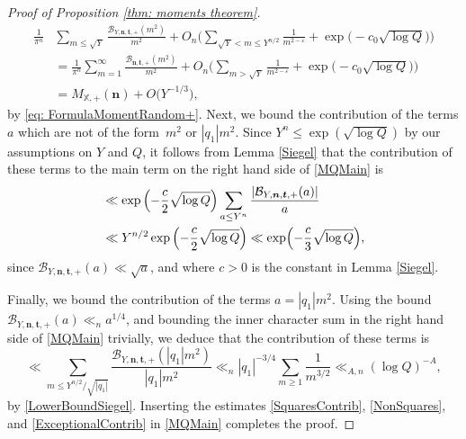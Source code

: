 \documentclass[10pt]{amsart}
\theoremstyle{plain}
\theoremstyle{definition}
\newcommand{\X}{\mathbb{X}}
\newcommand{\B}{\mathcal{B}}
\newcommand{\un}{\boldsymbol{n}}
\newcommand{\ut}{\boldsymbol{t}}
\begin{document}
\begin{proof}[Proof of Proposition \ref{thm: moments theorem}]
\begin{equation}
\begin{aligned}
\frac{1}{\pi^n}&\sum_{m\leq \sqrt{Y}}\frac{\B_{Y,\un, \ut, +}(m^2)}{m^2} + O_n\biggl(\sum_{\sqrt{Y}<m\leq Y^{n/2}}\frac{1}{m^{2-\varepsilon}}+ \exp\bigl(-c_0\sqrt{\log Q}\bigr)\biggr)\\
&= \frac{1}{\pi^n}\sum_{m=1}^{\infty}\frac{\B_{\un, \ut, +}(m^2)}{m^2} + O_n\biggl(\sum_{m> \sqrt{Y}}\frac{1}{m^{2-\varepsilon}}+\exp\bigl(-c_0\sqrt{\log Q}\bigr)\biggr)\\
&= M_{\X, +}(\un)+ O\bigl(Y^{-1/3}\bigr),
\end{aligned}
\end{equation}
by \eqref{eq: FormulaMomentRandom+}.
Next, we bound the contribution of the terms $a$ which are not of the form~$m^2$ or $|q_1|m^2$. Since $Y^n\leq \exp\left(\sqrt{\log Q}\right)$ by our assumptions on $Y$ and $Q$, it follows from Lemma \ref{Siegel} that the contribution of these terms to the main term on the right hand side of \eqref{MQMain} is
\begin{equation}\label{NonSquares}
\begin{aligned}
&\ll \exp\left(-\frac{c}{2}\sqrt{\log Q}\right)\sum_{a\leq Y^n}\frac{|\B_{Y,\un, \ut, +}(a)|}{a}\\
&\ll Y^{n/2} \exp\left(-\frac{c}{2}\sqrt{\log Q}\right) \ll \exp\Bigl(-\frac{c}{3}\sqrt{\log Q}\Bigr),
\end{aligned}
\end{equation}
since $\B_{Y,\un, \ut, +}(a)\ll \sqrt{a}$, and where $c>0$ is the constant in Lemma \ref{Siegel}.

Finally, we bound the contribution of the terms $a=|q_1|m^2$. Using the bound $\B_{Y,\un, \ut, +}(a)\ll_{n} a^{1/4}$, and bounding the inner character sum in the right hand side of \eqref{MQMain} trivially, we deduce that the contribution of these terms is
\begin{equation}\label{ExceptionalContrib}
\ll \sum_{m\leq Y^{n/2}/\sqrt{|q_1|}}\frac{\B_{Y,\un, \ut, +}(|q_1|m^2)}{|q_1|m^2}\ll_{n} |q_1|^{-3/4}\sum_{m\geq 1}\frac{1}{m^{3/2}}\ll_{A, n} (\log Q)^{-A},
\end{equation}
by \eqref{LowerBoundSiegel}.
Inserting the estimates \eqref{SquaresContrib}, \eqref{NonSquares}, and \eqref{ExceptionalContrib} in \eqref{MQMain} completes the proof.
\end{proof}
\end{document}

